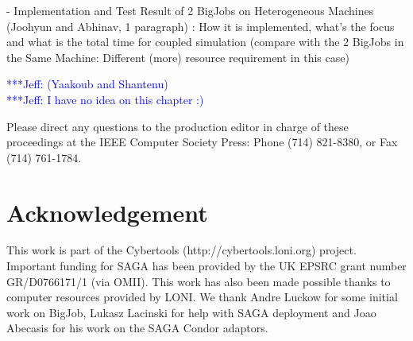 \documentclass[times, 10pt,twocolumn]{article}
\newcommand{\skonote}[1]{ {\textcolor{blue} { ***Jeff: #1 }}}
\newcommand{\skonote}[1]{}
\begin{document}
- Implementation and Test Result of 2 BigJobs on Heterogeneous Machines (Joohyun and Abhinav, 1 paragraph)
: How it is implemented, what's the focus and what is the total time for coupled simulation (compare with the 2 BigJobs in the Same Machine: Different (more) resource requirement in this case) 


\skonote{(Yaakoub and Shantenu)}\\
\skonote{I have no idea on this chapter :)}



Please direct any questions to the production editor in charge of these 
proceedings at the IEEE Computer Society Press: Phone (714) 821-8380, or 
Fax (714) 761-1784.

\section*{Acknowledgement}
This work is part of the Cybertools (http://cybertools.loni.org) project. Important funding for SAGA has been provided by the UK EPSRC grant number GR/D0766171/1 (via OMII).  This work has also been made possible thanks to computer resources provided by LONI.  We thank Andre Luckow for some initial work on BigJob, Lukasz Lacinski for help with SAGA deployment and Joao Abecasis for his work on the SAGA Condor adaptors.

\nocite{ex1,ex2}


\end{document}
